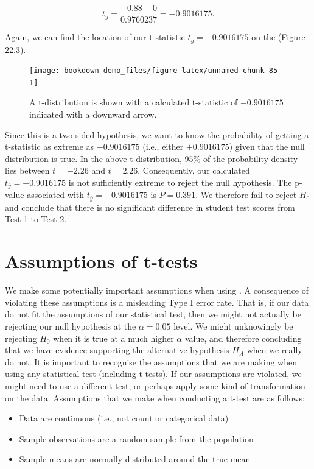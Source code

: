 \documentclass[
  openany]{krantz}
\providecommand{\tightlist}{%
  \setlength{\itemsep}{0pt}\setlength{\parskip}{0pt}}
\begin{document}
\[t_{\bar{y}} = \frac{-0.88 - 0}{0.9760237} = -0.9016175.\]

Again, we can find the location of our t-statistic \(t_{\bar{y}} = -0.9016175\) on the  (Figure 22.3).

\begin{figure}
\texttt{[image: bookdown-demo\_files/figure-latex/unnamed-chunk-85-1]} \caption{A t-distribution is shown with a calculated t-statistic of $-0.9016175$ indicated with a downward arrow.}\label{fig:unnamed-chunk-85}
\end{figure}

\newpage

Since this is a two-sided hypothesis, we want to know the probability of getting a t-statistic as extreme as \(-0.9016175\) (i.e., either \(\pm 0.9016175\)) given that the null distribution is true.
In the above t-distribution, 95\% of the probability density lies between \(t = -2.26\) and \(t = 2.26\).
Consequently, our calculated \(t_{\bar{y}} = -0.9016175\) is not sufficiently extreme to reject the null hypothesis.
The p-value associated with \(t_{\bar{y}} = -0.9016175\) is \(P = 0.391\).
We therefore fail to reject \(H_{0}\) and conclude that there is no significant difference in student test scores from Test 1 to Test 2.

\hypertarget{assumptions-of-t-tests}{%
\section{Assumptions of t-tests}\label{assumptions-of-t-tests}}

We make some potentially important assumptions when using .
A consequence of violating these assumptions is a misleading Type I error rate.
That is, if our data do not fit the assumptions of our statistical test, then we might not actually be rejecting our null hypothesis at the \(\alpha = 0.05\) level.
We might unknowingly be rejecting \(H_{0}\) when it is true at a much higher \(\alpha\) value, and therefore concluding that we have evidence supporting the alternative hypothesis \(H_{A}\) when we really do not.
It is important to recognise the assumptions that we are making when using any statistical test (including t-tests).
If our assumptions are violated, we might need to use a different test, or perhaps apply some kind of transformation on the data.
Assumptions that we make when conducting a t-test are as follows:

\begin{itemize}
\tightlist
\item
  Data are continuous (i.e., not count or categorical data)
\item
  Sample observations are a random sample from the population
\item
  Sample means are normally distributed around the true mean
\end{itemize}
\end{document}
